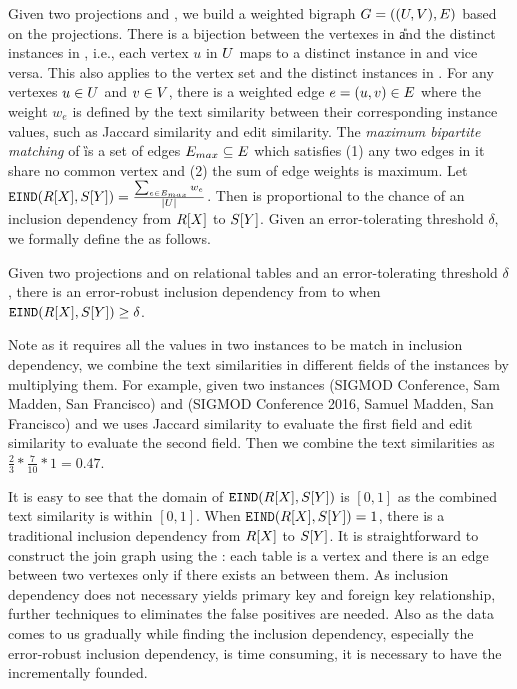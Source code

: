 Given two projections \RX and \SY, we build a weighted bigraph $G=((U,V),E)$ based on the projections. There is a bijection between the vertexes in \U and the distinct instances in \RX, i.e., each vertex $u$ in $U$ maps to a distinct instance in \RX and vice versa. This also applies to the vertex set \V and the distinct instances in \SY. For any vertexes $u\in U$ and $v\in V$, there is a weighted edge $e=(u,v)\in E$ where the weight $w_e$ is defined by the text similarity between their corresponding instance values, such as Jaccard similarity and edit similarity. The \emph{maximum bipartite matching} of \G is a set of edges $E_{max}\subseteq E$ which satisfies (1) any two edges in it share no common vertex and (2) the sum of edge weights is maximum. Let $\texttt{EIND}(R[X],S[Y])=\frac{\sum_{e\in E_{max}}w_e}{|U|}$. Then \EIND is proportional to the chance of an inclusion dependency from $R[X]$ to $S[Y]$. Given an error-tolerating threshold $\delta$, we formally define the \eind as follows.

\begin{definition}
Given two projections \RX and \SY on relational tables and an error-tolerating threshold $\delta$, there is an error-robust inclusion dependency from \X to \Y when $\texttt{EIND}(R[X],S[Y])\geq\delta$.
\end{definition}


Note as it requires all the values in two instances to be match in inclusion dependency, we combine the text  similarities in different fields of the instances by multiplying them. For example, given two instances \textsf{(SIGMOD Conference, Sam Madden, San Francisco)} and \textsf{(SIGMOD Conference 2016, Samuel Madden, San Francisco)} and we uses Jaccard similarity to evaluate the first field and edit similarity to evaluate the second field. Then we combine the text similarities as $\frac{2}{3}*\frac{7}{10}*1=0.47$.

It is easy to see that the domain of $\texttt{EIND}(R[X],S[Y])$ is $[0,1]$ as the combined text similarity is within $[0,1]$. When $\texttt{EIND}(R[X],S[Y])=1$, there is a traditional inclusion dependency from $R[X]$ to $S[Y]$. It is straightforward to construct the join graph using the \eind: each table is a vertex and there is an edge between two vertexes only if there exists an \eind between them. As inclusion dependency does not necessary yields primary key and foreign key relationship, further techniques to eliminates the false positives are needed. Also as the data comes to us gradually while finding the inclusion dependency, especially the error-robust inclusion dependency, is time consuming, it is necessary to have the \eind incrementally founded. %

